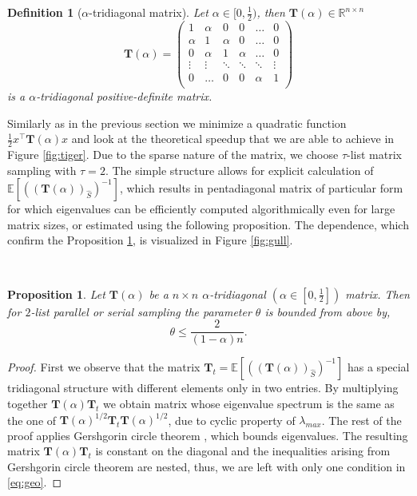 \documentclass[11pt]{article}
\newtheorem{definition}{Definition}
\newtheorem{proposition}{Proposition}
\begin{document}
	\begin{definition}[$\alpha$-tridiagonal matrix]
		Let $\alpha \in [0,\frac{1}{2})$, then $\mathbf{T}(\alpha) \in \mathbb{R}^{n \times n}$ 
		\begin{equation}
		\mathbf{T}(\alpha) = \begin{pmatrix}
		1 & \alpha & 0 & 0 & \dots & 0 \\
		\alpha & 1 & \alpha & 0 & \dots & 0 \\
		0 & \alpha & 1 & \alpha & \dots & 0 \\
		\vdots  & \vdots  & \ddots & \ddots & \ddots & \vdots \\
		0 &  \dots & 0 & 0 & \alpha & 1 \\
		\end{pmatrix}
		\end{equation}
				is a $\alpha$-tridiagonal positive-definite matrix.
	\end{definition}
	Similarly as in the previous section we minimize a quadratic function $\frac{1}{2}x^\top \mathbf{T}(\alpha)x$ and look at the theoretical speedup that we are able to achieve in Figure \ref{fig:tiger}. Due to the sparse nature of the matrix, we choose $\tau$-list matrix sampling with $\tau = 2$. The simple structure allows for explicit calculation of $\mathbb{E}[((\mathbf{T}(\alpha))_{\hat{S}})^{-1}]$, which results in pentadiagonal matrix of particular form for which eigenvalues can be efficiently computed algorithmically even for large  matrix sizes, or estimated using the following proposition. The dependence, which confirm the Proposition \ref{prop:tridiag}, is visualized in Figure \ref{fig:gull}. 
	

	\hfil \\
	
	\begin{proposition} \label{prop:tridiag}
		Let $\mathbf{T}(\alpha)$ be a $n\times n$ $\alpha$-tridiagonal $(\alpha \in [0,\frac{1}{2}])$ matrix. Then for $2$-list parallel or serial sampling the parameter $ \theta$ is bounded from above by,
		\begin{equation}\label{eq:geo}
			 \theta \leq \frac{2}{(1-\alpha)n}.
		\end{equation}
	\end{proposition}
	\begin{proof}
		First we observe that the matrix $\mathbf{T}_t = \mathbb{E}[((\mathbf{T}(\alpha))_{\hat{S}})^{-1}]$ has a special tridiagonal structure with different elements only in two entries. By multiplying together $\mathbf{T}(\alpha)\mathbf{T}_t$ we obtain matrix whose eigenvalue spectrum is the same as the one of $\mathbf{T}(\alpha)^{1/2}\mathbf{T}_t\mathbf{T}(\alpha)	^{1/2}$, due to cyclic property of $\lambda_{max}$. The rest of the proof applies Gershgorin circle theorem \cite{Gerschgorin1931}, which bounds eigenvalues. The resulting matrix  $\mathbf{T}(\alpha)\mathbf{T}_t$ is constant on the diagonal and the inequalities arising from Gershgorin circle theorem are nested, thus, we are left with only one condition in \eqref{eq:geo}.
	\end{proof}
	
\end{document}
